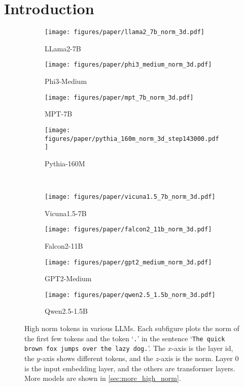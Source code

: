 \vspace{-1em}
\section{Introduction}\label{sec:intro}
\begin{figure*}[!t]
    \centering
    \begin{subfigure}[t]{0.22\textwidth}
        \texttt{[image: figures/paper/llama2\_7b\_norm\_3d.pdf]}
        \caption{LLama2-7B}\label{fig:llama2_7b_norm_3d}
    \end{subfigure}
    \begin{subfigure}[t]{0.22\textwidth}
        \texttt{[image: figures/paper/phi3\_medium\_norm\_3d.pdf]}
        \caption{Phi3-Medium}\label{fig:phi3_medium_norm_3d}
    \end{subfigure}
    \begin{subfigure}[t]{0.22\textwidth}
        \texttt{[image: figures/paper/mpt\_7b\_norm\_3d.pdf]}
        \caption{MPT-7B}\label{fig:mpt_7b_norm_3d}
    \end{subfigure}
    \begin{subfigure}[t]{0.22\textwidth}
        \texttt{[image: figures/paper/pythia\_160m\_norm\_3d\_step143000.pdf]}
        \caption{Pythia-160M}\label{fig:pythia_160m_norm_3d_step143000}
    \end{subfigure}
    \\
    \begin{subfigure}[t]{0.22\textwidth}
        \texttt{[image: figures/paper/vicuna1.5\_7b\_norm\_3d.pdf]}
        \caption{Vicuna1.5-7B}\label{fig:vicuna15_7b_norm_3d}
    \end{subfigure}
    \begin{subfigure}[t]{0.22\textwidth}
        \texttt{[image: figures/paper/falcon2\_11b\_norm\_3d.pdf]}
        \caption{Falcon2-11B}\label{fig:falcon2_11b_norm_3d}
    \end{subfigure}
    \begin{subfigure}[t]{0.22\textwidth}
        \texttt{[image: figures/paper/gpt2\_medium\_norm\_3d.pdf]}
        \caption{GPT2-Medium}\label{fig:gpt2_medium_norm_3d}
    \end{subfigure}
    \begin{subfigure}[t]{0.22\textwidth}
        \texttt{[image: figures/paper/qwen2.5\_1.5b\_norm\_3d.pdf]}
        \caption{Qwen2.5-1.5B}\label{fig:qwen25_15b_norm_3d}
    \end{subfigure}
\vspace{-0.5em}
\caption{High norm tokens in various LLMs.
    Each subfigure plots the norm of the first few tokens and the token `\texttt{.}' in the sentence `\texttt{The quick brown fox jumps over the lazy dog.}'. The \(x\)-axis is the layer id, the \(y\)-axis shows different tokens, and the \(z\)-axis is the norm.
    Layer 0 is the input embedding layer, and the others are transformer layers.
        More models are shown in \cref{sec:more_high_norm}.
    }\label{fig:llm_norm}
\vspace{-0.5em}
\end{figure*}

